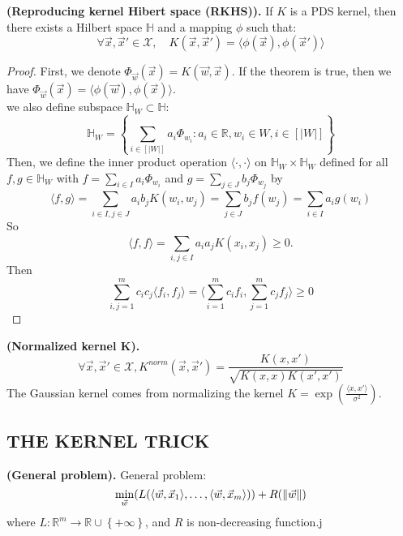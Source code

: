 \begin{theorem}
    \textbf{(Reproducing kernel Hibert space (RKHS)).}
    If $ K $ is a PDS kernel, then there exists a Hilbert space $ \mathbb{H} $ and a mapping $ \phi $ such that:
    \[
        \forall \vec{x}, \vec{x}' \in \mathcal{X}, \quad K(\vec{x}, \vec{x}') = \langle \phi(\vec{x}), \phi(\vec{x}') \rangle
    \]
    \begin{proof}
        First, we denote $ \Phi_{\vec{w}}(\vec{x}) = K(\vec{w}, \vec{x}) $.
    If the theorem is true, then we have $ \Phi_{\vec{w}}(\vec{x}) = \langle \phi(\vec{w}), \phi(\vec{x}) \rangle $.\\
        we also define subspace $ \mathbb{H}_W \subset \mathbb{H} $:
        \[
            \mathbb{H}_W = \left\{ \sum^{}_{i \in [|W|]} a_i \Phi_{w_i} : a_i \in \mathbb{R}, w_i \in W, i \in [|W|] \right\}
        \]
        Then, we define the inner product operation $ \langle \cdot, \cdot \rangle $ on $ \mathbb{H}_W \times \mathbb{H}_W $ defined for all $ f, g \in \mathbb{H}_W $ with $ f = \sum^{}_{i \in I} a_i \Phi_{w_i} $ and $ g = \sum^{}_{j \in J} b_j \Phi_{w_j} $ by
        \[
            \langle f, g \rangle = \sum^{}_{i \in I, j \in J} a_i b_j K(w_i, w_j) = \sum^{}_{j \in J} b_j f(w_j) = \sum^{}_{i \in I} a_i g(w_i)
        \]
        So 
        \[
            \langle f, f \rangle = \sum^{}_{i,j\in I} a_i a_j K(x_i, x_j) \ge 0.
        \]
        Then
        \[
            \sum^{m}_{i, j = 1} c_i c_j \langle f_i, f_j \rangle
            = \langle \sum^{m}_{i=1} c_i f_i, \sum^{m}_{j=1} c_j f_j \rangle \ge 0
        \]
    \end{proof}
\end{theorem}

\begin{definition}
    \textbf{(Normalized kernel K).}
    \[
        \forall \vec{x}, \vec{x}' \in \mathcal{X},
        K^{norm}(\vec{x}, \vec{x}') = \frac{K(x, x')}{\sqrt{K(x, x) K(x', x') }}
    \]
    The Gaussian kernel comes from normalizing the kernel $ K = \exp\left( \frac{\langle x, x' \rangle}{\sigma^2} \right) $.
\end{definition}

\subsection{THE KERNEL TRICK}%
\label{sub:the_kernel_trick}

\begin{definition}
    \textbf{(General problem).}
    General problem:
    \[
        \min_{\vec{w}} (L(\langle \vec{w}, \vec{x}_1 \rangle, \ldots, \langle \vec{w}, \vec{x}_m \rangle)) + R( \Arrowvert \vec{w} \Arrowvert)
    \]
    where $ L: \mathbb{R}^m \rightarrow \mathbb{R} \cup \left\{ +\infty \right\} $, and $ R $ is non-decreasing function.j
\end{definition}

